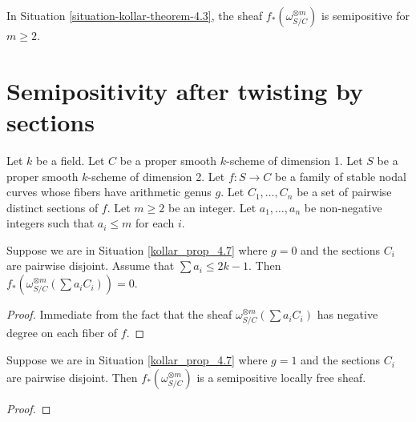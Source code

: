 \begin{theorem}[cf.\ {\cite[Theorem 4.3]{Ko90}}]
\label{theorem-kollar-theorem-4.3}
In Situation \ref{situation-kollar-theorem-4.3}, 
the sheaf $f_*(\omega_{S/C}^{\otimes m})$ is semipositive for $m \ge 2$. 
\end{theorem}








\section{Semipositivity after twisting by sections}

\begin{situation}\label{kollar_prop_4.7}
Let $k$ be a field.
Let $C$ be a proper smooth $k$-scheme of dimension 1.
Let $S$ be a proper smooth $k$-scheme of dimension 2.
Let $f:S\to C$ be a family of stable nodal curves whose fibers have arithmetic genus $g$.
Let $C_1,\ldots,C_n$ be a set of pairwise distinct sections of $f$.
Let $m\ge2$ be an integer.
Let $a_1,\ldots,a_n$ be non-negative integers such that $a_i\le m$ for each $i$.
\end{situation}

\begin{lemma}\label{base_case_genus_0}
Suppose we are in Situation \ref{kollar_prop_4.7} where $g=0$ and the sections $C_i$ are pairwise disjoint.
Assume that $\sum a_i\le 2k-1$.
Then $f_{*}(\omega_{S/C}^{\otimes m}(\sum a_iC_i))=0$. 
\end{lemma}
\begin{proof}
Immediate from the fact that the sheaf $\omega_{S/C}^{\otimes m}(\sum a_iC_i)$ has negative degree on each fiber of $f$.
\end{proof}

\begin{lemma}\label{base_case_genus_1}
Suppose we are in Situation \ref{kollar_prop_4.7} where $g=1$ and the sections $C_i$ are pairwise disjoint.
Then $f_{*}(\omega_{S/C}^{\otimes m})$ is a semipositive locally free sheaf. 
\end{lemma}
\begin{proof}
\end{proof}

